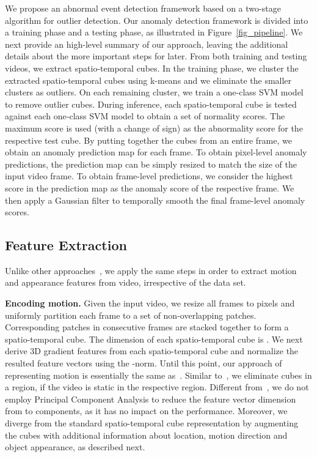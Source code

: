 \documentclass[10pt,twocolumn,letterpaper]{article}
\begin{document}
We propose an abnormal event detection framework based on a two-stage algorithm for outlier detection. Our anomaly detection framework is divided into a training phase and a testing phase, as illustrated in Figure~\ref{fig_pipeline}. We next provide an high-level summary of our approach, leaving the additional details about the more important steps for later. From both training and testing videos, we extract spatio-temporal cubes. In the training phase, we cluster the extracted spatio-temporal cubes using k-means and we eliminate the smaller clusters as outliers. On each remaining cluster, we train a one-class SVM model to remove outlier cubes. During inference, each spatio-temporal cube is tested against each one-class SVM model to obtain a set of normality scores. The maximum score is used (with a change of sign) as the abnormality score for the respective test cube. By putting together the cubes from an entire frame, we obtain an anomaly prediction map for each frame. To obtain pixel-level anomaly predictions, the prediction map can be simply resized to match the size of the input video frame. To obtain frame-level predictions, we consider the highest score in the prediction map as the anomaly score of the respective frame. We then apply a Gaussian filter to temporally smooth the final frame-level anomaly scores.



\vspace*{-0.1cm}
\subsection{Feature Extraction}
\label{sec_Features}
\vspace*{-0.1cm}

Unlike other approaches~\cite{Cheng-CVPR-2015,Xu-BMVC-2015}, we apply the same steps in order to extract motion and appearance features from video, irrespective of the data set.

\noindent
{\bf Encoding motion.}
Given the input video, we resize all frames to  pixels and uniformly partition each frame to a set of non-overlapping  patches. Corresponding patches in  consecutive frames are stacked together to form a spatio-temporal cube. The dimension of each spatio-temporal cube is . We next derive 3D gradient features from each spatio-temporal cube and normalize the resulted feature vectors using the -norm. Until this point, our approach of representing motion is essentially the same as~\cite{Giorno-ECCV-2016,Ionescu-ICCV-2017,Lu-ICCV-2013}. Similar to~\cite{Giorno-ECCV-2016,Ionescu-ICCV-2017,Lu-ICCV-2013}, we eliminate cubes in a region, if the video is static in the respective region. Different from~\cite{Giorno-ECCV-2016,Lu-ICCV-2013}, we do not employ Principal Component Analysis to reduce the feature vector dimension from  to  components, as it has no impact on the performance. Moreover, we diverge from the standard spatio-temporal cube representation by augmenting the cubes with additional information about location, motion direction and object appearance, as described next.
\end{document}
